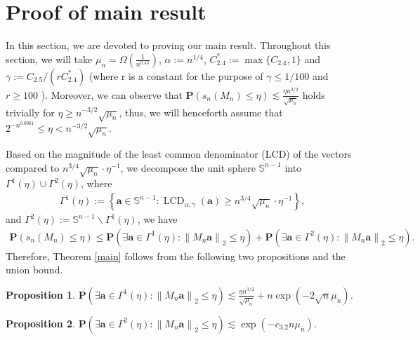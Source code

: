 \documentclass{article}
\numberwithin{equation}{section}
\theoremstyle{plain}
\newtheorem{proposition}{Proposition}[section]
\begin{document}
\section{Proof of main result}\label{sec3}
In this section, we are devoted to proving our main result. Throughout this section, we will take $\mu_{n}=\Omega (\frac{1}{n^{0.45}})$, $\alpha:=n^{1 / 4}$, $C^*_{2.4}:=\max\{C_{2.4},1\}$ and $\gamma:=C_{2.5} /\left(r C^*_{2.4}\right)$ (where r is a constant for the purpose of $\gamma \leq 1 / 100$ and $r\ge100$ ). Moreover, we can observe that $\textbf{P}\left(s_n\left(M_n\right) \leq \eta\right) \lesssim \frac{\eta n^{3 / 2}}{\sqrt{\mu_{n}}}$ holds trivially for $\eta \geq n^{-3 / 2}\sqrt{\mu_{n}}$, thus, we will henceforth assume that $2^{-n^{0.0001}} \leq \eta<n^{-3 / 2}\sqrt{\mu_{n}}$.
\par
Based on the magnitude of the least common denominator (LCD) of the vectors compared to $n^{3/4}\sqrt{\mu_{n}}\cdot\eta^{-1}$, we decompose the unit sphere $\mathbb{S}^{n-1}$ into $\Gamma^1(\eta) \cup \Gamma^2(\eta)$, where
\begin{align*}
\Gamma^1(\eta):=\left\{\boldsymbol{a} \in \mathbb{S}^{n-1}: \operatorname{LCD}_{\alpha, \gamma}(\boldsymbol{a}) \geq  n^{3 / 4}\sqrt{\mu_{n}} \cdot \eta^{-1}\right\},
\end{align*}
and $\Gamma^2(\eta):=\mathbb{S}^{n-1} \backslash \Gamma^1(\eta)$, we have
\begin{align*}
\textbf{P}\left(s_n\left(M_n\right) \leq \eta\right) \leq  \textbf{P}\left(\exists \boldsymbol{a} \in \Gamma^1(\eta):\left\|M_n \boldsymbol{a}\right\|_2 \leq \eta\right) +\textbf{P}\left(\exists \boldsymbol{a} \in \Gamma^2(\eta):\left\|M_n \boldsymbol{a}\right\|_2 \leq \eta\right).
\end{align*}
Therefore, Theorem \ref{main} follows from the following two propositions and the union bound.
\begin{proposition}\label{pro1}
$\textbf{P}\left(\exists \boldsymbol{a} \in \Gamma^1(\eta):\left\|M_n \boldsymbol{a}\right\|_2 \leq \eta\right) \lesssim \frac{\eta n^{3 / 2}}{\sqrt{\mu_{n}}}+n \exp (-2\sqrt{n}\mu_{n})$.
\end{proposition}

\begin{proposition}\label{pro2}
$\textbf{P}\left(\exists \boldsymbol{a} \in \Gamma^2(\eta):\left\|M_n \boldsymbol{a}\right\|_2 \leq \eta\right) \lesssim \exp \left(-c_{3.2} n\mu_{n}\right)$.
\end{proposition}
\end{document}
